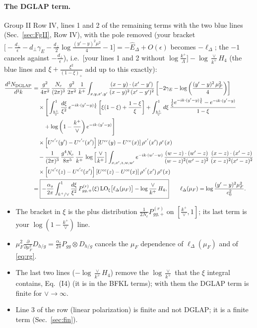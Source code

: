 \documentclass[10pt]{article}
\numberwithin{equation}{section}
\begin{document}
\paragraph{The DGLAP term.} Group II Row IV, lines 1 and 2 of the remaining terms with the two blue lines (Sec.~\ref{sec:FgII}, Row IV), with the pole removed (your bracket $\big[-\frac{d_\perp}{\epsilon}-d_\perp\gamma_E-\frac{d_\perp}{2}\log\frac{(y'-y)^2\mu^2}{4}-1\big]=-\hat E_\Delta+O(\epsilon)$ becomes $-\ell_\Delta$; the $-1$ cancels against $-\frac{d_\perp}{\epsilon}$), i.e.\ $\big[$your lines 1 and 2 without $\log\frac{k^+}{\Lambda}\big]-\log\frac{\vee}{k^+}H_4$ (the blue lines and $\xi+\frac{\xi^2}{(1-\xi)_+}$ add up to this exactly):
\begin{align}
\frac{d^{3}N_{\rm DGLAP}}{d^{3}k}&=\frac{g^{2}}{4\pi^{2}}\,\frac{N_{c}}{(2\pi)^{3}}\,\frac{g^{2}}{2\pi^{2}}\,\frac{1}{k^{+}}\int_{x,y,x',y'}\frac{(x-y)\cdot(x'-y')}{(x-y)^{2}\,(x'-y')^{2}}\left[-2\gamma_{E}-\log\left(\frac{(y'-y)^{2}\,\mu_{F}^{2}}{4}\right)\right]\notag\\
&\quad\times\Bigg[\int_{\frac{k^{+}}{\vee}}^{1}\frac{d\xi}{\xi^{2}}\,e^{-ik\cdot(y'-y)\frac{1}{\xi}}\left[\xi(1-\xi)+\frac{1-\xi}{\xi}\right]+\int_{\frac{k^{+}}{\vee}}^{1}d\xi\,\frac{\frac{1}{\xi}e^{-ik\cdot(y'-y)\frac{1}{\xi}}-e^{-ik\cdot(y'-y)}}{1-\xi}\notag\\
&\qquad+\log\left(1-\frac{k^{+}}{\vee}\right)e^{-ik\cdot(y'-y)}\Bigg]\notag\\
&\quad\times\left[U^{e'c}(y')-U^{e'c}(x')\right]\left[U^{ec}(y)-U^{ce}(x)\right]\rho^{e'}(x')\,\rho^{e}(x)\notag\\
&\quad-\frac{1}{(2\pi)^{3}}\,\frac{g^{4}N_{c}}{8\pi^{5}}\,\frac{1}{k^{+}}\,\log{\left[\frac{\vee}{k^{+}}\right]}\int_{x,x',z,w,w'}e^{-ik\cdot(w'-w)}\,\frac{(w-z)\cdot(w'-z)}{(w-z)^{2}(w'-z)^{2}}\,\frac{(x-z)\cdot(x'-z)}{(x-z)^{2}(x'-z)^{2}}\notag\\
&\quad\times\left[U^{e'c}(z)-U^{e'c}(x')\right]\left[U^{ec}(z)-U^{ce}(x)\right]\rho^{e'}(x')\,\rho^{e}(x)\notag\\
&=\boxed{-\frac{\alpha_s}{2\pi}\int_{k^+/\vee}^{1}\frac{d\xi}{\xi^{2}}\,P^{(r)}_{gg,+}(\xi)\,{\rm LO}_\xi\big[\ell_\Delta(\mu_F)\big]-\log\frac{\vee}{k^+}\,H_4,}\qquad \ell_\Delta(\mu_F)=\log\frac{(y'-y)^2\mu_F^2}{c_0^2}.
\label{eq:dglap}
\end{align}
\begin{itemize}
\item The bracket in $\xi$ is the plus distribution $\frac{1}{2N_c}P^{(r)}_{gg,+}$ on $[\frac{k^+}{\vee},1]$; its last term is your $\log(1-\frac{k^+}{\vee})$ line.
\item $\mu_F^2\frac{\partial}{\partial\mu_F^2}D_{h/g}=\frac{\alpha_s}{2\pi}P_{gg}\otimes D_{h/g}$ cancels the $\mu_F$ dependence of $\ell_\Delta(\mu_F)$ and of \eqref{eq:rg}.
\item The last two lines ($-\log\frac{\vee}{k^+}H_4$) remove the $\log\frac{\vee}{k^+}$ that the $\xi$ integral contains, Eq.~(I4) (it is in the BFKL terms); with them the DGLAP term is finite for $\vee\to\infty$.
\item Line 3 of the row (linear polarization) is finite and not DGLAP; it is a finite term (Sec.~\ref{sec:fin}).
\end{itemize}
\end{document}
